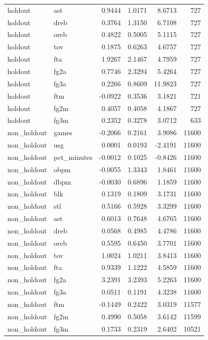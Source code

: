 \begin{table}
\begin{tabular}{llrrrr}
holdout & ast & 0.9444 & 1.0171 & 8.6713 & 727 \\
holdout & dreb & 0.3764 & 1.3150 & 6.7108 & 727 \\
holdout & oreb & 0.4822 & 0.5005 & 5.1115 & 727 \\
holdout & tov & 0.1875 & 0.6263 & 4.6757 & 727 \\
holdout & fta & 1.9267 & 2.1467 & 4.7959 & 727 \\
holdout & fg2a & 0.7746 & 2.3294 & 5.4264 & 727 \\
holdout & fg3a & 0.2266 & 0.8609 & 11.9823 & 727 \\
holdout & ftm & -0.0922 & 0.3536 & 3.1821 & 721 \\
holdout & fg2m & 0.4057 & 0.4058 & 4.1867 & 727 \\
holdout & fg3m & 0.2352 & 0.3278 & 3.0712 & 633 \\
non\_holdout & games & -0.2066 & 0.2161 & 3.9086 & 11600 \\
non\_holdout & usg & 0.0001 & 0.0193 & -2.4191 & 11600 \\
non\_holdout & pct\_minutes & -0.0012 & 0.1025 & -0.8426 & 11600 \\
non\_holdout & obpm & -0.0055 & 1.3343 & 1.8461 & 11600 \\
non\_holdout & dbpm & -0.0030 & 0.6896 & 1.1859 & 11600 \\
non\_holdout & blk & 0.1319 & 0.1809 & 3.1731 & 11600 \\
non\_holdout & stl & 0.5166 & 0.5928 & 3.3299 & 11600 \\
non\_holdout & ast & 0.6013 & 0.7648 & 4.6765 & 11600 \\
non\_holdout & dreb & 0.0568 & 0.4985 & 4.4786 & 11600 \\
non\_holdout & oreb & 0.5595 & 0.6450 & 3.7701 & 11600 \\
non\_holdout & tov & 1.0024 & 1.0211 & 3.8413 & 11600 \\
non\_holdout & fta & 0.9339 & 1.1222 & 4.5859 & 11600 \\
non\_holdout & fg2a & 3.2391 & 3.2393 & 5.2263 & 11600 \\
non\_holdout & fg3a & 0.0511 & 0.1191 & 4.3238 & 11600 \\
non\_holdout & ftm & -0.1449 & 0.2422 & 3.0319 & 11577 \\
non\_holdout & fg2m & 0.4990 & 0.5058 & 3.6142 & 11599 \\
non\_holdout & fg3m & 0.1733 & 0.2319 & 2.6402 & 10521 \\
\bottomrule
\end{tabular}
\end{table}
